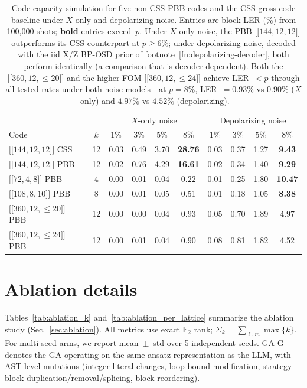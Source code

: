 \documentclass[aps,prxquantum,twocolumn,superscriptaddress,nofootinbib]{revtex4-2}
\newcommand{\FF}{\ensuremath{\mathbb{F}}}
\newcommand{\dblbrk}[1]{\ensuremath{\lbrack\!\lbrack #1 \rbrack\!\rbrack}}
\newcommand{\code}[1]{\dblbrk{#1}}
\begin{document}
\begin{table}[t]
\centering
\caption{Code-capacity simulation for five non-CSS PBB codes and the CSS gross-code baseline under $X$-only and depolarizing noise.
Entries are block LER (\%) from 100{,}000 shots; \textbf{bold} entries exceed~$p$.
Under $X$-only noise, the PBB $\code{144,12,12}$ outperforms its CSS counterpart at $p \geq 6\%$; under depolarizing noise, decoded with the iid X/Z BP-OSD prior of footnote~\ref{fn:depolarizing-decoder}, both perform identically (a comparison that is decoder-dependent).
Both the $\code{360,12,{\leq}20}$ and the higher-FOM $\code{360,12,{\leq}24}$ achieve LER~$< p$ through all tested rates under both noise models---at $p = 8\%$, LER~$= 0.93\%$ vs $0.90\%$ ($X$-only) and $4.97\%$ vs $4.52\%$ (depolarizing).}
\label{tab:threshold_noncss}
\small
\begin{tabular}{l c | cccc | cccc}
\toprule
& & \multicolumn{4}{c|}{$X$-only noise} & \multicolumn{4}{c}{Depolarizing noise} \\
Code & $k$ & $1\%$ & $3\%$ & $5\%$ & $8\%$ & $1\%$ & $3\%$ & $5\%$ & $8\%$ \\
\midrule
$\code{144,12,12}$ CSS~\cite{bravyi2024high} & 12 & 0.03 & 0.49 & 3.70 & \textbf{28.76} & 0.03 & 0.37 & 1.27 & \textbf{9.43} \\
$\code{144,12,12}$ PBB & 12 & 0.02 & 0.76 & 4.29 & \textbf{16.61} & 0.02 & 0.34 & 1.40 & \textbf{9.29} \\
$\code{72,4,8}$ PBB & 4 & 0.00 & 0.01 & 0.04 & 0.22 & 0.01 & 0.25 & 1.80 & \textbf{10.47} \\
$\code{108,8,10}$ PBB & 8 & 0.00 & 0.01 & 0.05 & 0.51 & 0.01 & 0.18 & 1.05 & \textbf{8.38} \\
$\code{360,12,{\leq}20}$ PBB & 12 & 0.00 & 0.00 & 0.04 & 0.93 & 0.05 & 0.70 & 1.89 & 4.97 \\
$\code{360,12,{\leq}24}$ PBB & 12 & 0.00 & 0.01 & 0.04 & 0.90 & 0.08 & 0.81 & 1.82 & 4.52 \\
\bottomrule
\end{tabular}
\end{table}

\section{Ablation details}
\label{app:ablation}

Tables~\ref{tab:ablation_k} and~\ref{tab:ablation_per_lattice} summarize the ablation study (Sec.~\ref{sec:ablation}).
All metrics use exact $\FF_2$ rank; $\Sigma_k = \sum_{\ell,m} \max\{k\}$.
For multi-seed arms, we report mean~$\pm$~std over 5 independent seeds.
GA-G denotes the GA operating on the same ansatz representation as the LLM, with AST-level mutations (integer literal changes, loop bound modification, strategy block duplication/removal/splicing, block reordering). 
\end{document}
